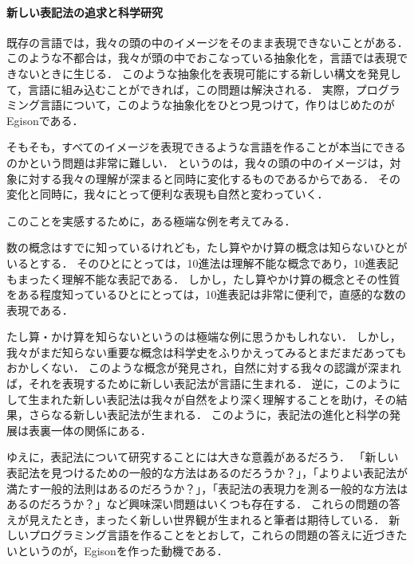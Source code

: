 \begin{oframed}
  \paragraph{新しい表記法の追求と科学研究}
  既存の言語では，我々の頭の中のイメージをそのまま表現できないことがある．
  このような不都合は，我々が頭の中でおこなっている抽象化を，言語では表現できないときに生じる．
  このような抽象化を表現可能にする新しい構文を発見して，言語に組み込むことができれば，この問題は解決される．
  実際，プログラミング言語について，このような抽象化をひとつ見つけて，作りはじめたのがEgisonである．

  そもそも，すべてのイメージを表現できるような言語を作ることが本当にできるのかという問題は非常に難しい．
  というのは，我々の頭の中のイメージは，対象に対する我々の理解が深まると同時に変化するものであるからである．
  その変化と同時に，我々にとって便利な表現も自然と変わっていく．

  このことを実感するために，ある極端な例を考えてみる．

  数の概念はすでに知っているけれども，たし算やかけ算の概念は知らないひとがいるとする．
  そのひとにとっては，10進法は理解不能な概念であり，10進表記もまったく理解不能な表記である．
  しかし，たし算やかけ算の概念とその性質をある程度知っているひとにとっては，10進表記は非常に便利で，直感的な数の表現である．

  たし算・かけ算を知らないというのは極端な例に思うかもしれない．
  しかし，我々がまだ知らない重要な概念は科学史をふりかえってみるとまだまだあってもおかしくない．
  このような概念が発見され，自然に対する我々の認識が深まれば，それを表現するために新しい表記法が言語に生まれる．
  逆に，このようにして生まれた新しい表記法は我々が自然をより深く理解することを助け，その結果，さらなる新しい表記法が生まれる．
  このように，表記法の進化と科学の発展は表裏一体の関係にある．

  ゆえに，表記法について研究することには大きな意義があるだろう．
  「新しい表記法を見つけるための一般的な方法はあるのだろうか？」，「よりよい表記法が満たす一般的法則はあるのだろうか？」，「表記法の表現力を測る一般的な方法はあるのだろうか？」など興味深い問題はいくつも存在する．
  これらの問題の答えが見えたとき，まったく新しい世界観が生まれると筆者は期待している．
  新しいプログラミング言語を作ることをとおして，これらの問題の答えに近づきたいというのが，Egisonを作った動機である．
\end{oframed}

